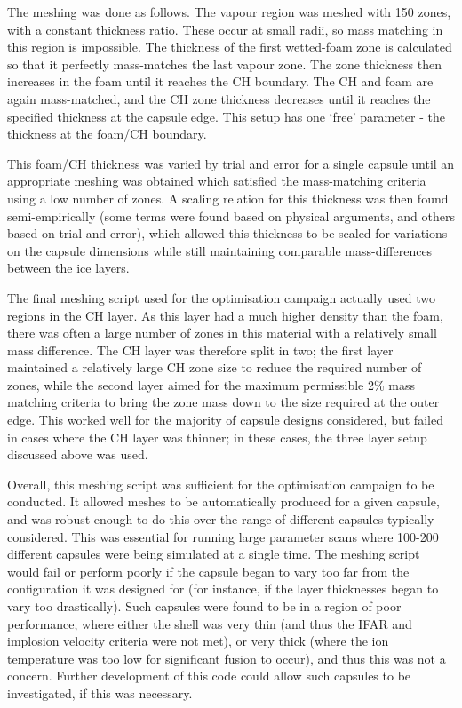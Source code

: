 The meshing was done as follows. The vapour region was meshed with 150 zones, with a constant thickness ratio. These occur at small radii, so mass matching in this region is impossible. The thickness of the first wetted-foam zone is calculated so that it perfectly mass-matches the last vapour zone. The zone thickness then increases in the foam until it reaches the CH boundary. The CH and foam are again mass-matched, and the CH zone thickness decreases until it reaches the specified thickness at the capsule edge. This setup has one `free' parameter - the thickness at the foam/CH boundary.

This foam/CH thickness was varied by trial and error for a single capsule until an appropriate meshing was obtained which satisfied the mass-matching criteria using a low number of zones. A scaling relation for this thickness was then found semi-empirically (some terms were found based on physical arguments, and others based on trial and error), which allowed this thickness to be scaled for variations on the capsule dimensions while still maintaining comparable mass-differences between the ice layers.

The final meshing script used for the optimisation campaign actually used two regions in the CH layer. As this layer had a much higher density than the foam, there was often a large number of zones in this material with a relatively small mass difference. The CH layer was therefore split in two; the first layer maintained a relatively large CH zone size to reduce the required number of zones, while the second layer aimed for the maximum permissible 2\% mass matching criteria to bring the zone mass down to the size required at the outer edge. This worked well for the majority of capsule designs considered, but failed in cases where the CH layer was thinner; in these cases, the three layer setup discussed above was used.

Overall, this meshing script was sufficient for the optimisation campaign to be conducted. It allowed meshes to be automatically produced for a given capsule, and was robust enough to do this over the range of different capsules typically considered. This was essential for running large parameter scans where 100-200 different capsules were being simulated at a single time. The meshing script would fail or perform poorly if the capsule began to vary too far from the configuration it was designed for (for instance, if the layer thicknesses began to vary too drastically). Such capsules were found to be in a region of poor performance, where either the shell was very thin (and thus the IFAR and implosion velocity criteria were not met), or very thick (where the ion temperature was too low for significant fusion to occur), and thus this was not a concern. Further development of this code could allow such capsules to be investigated, if this was necessary.

